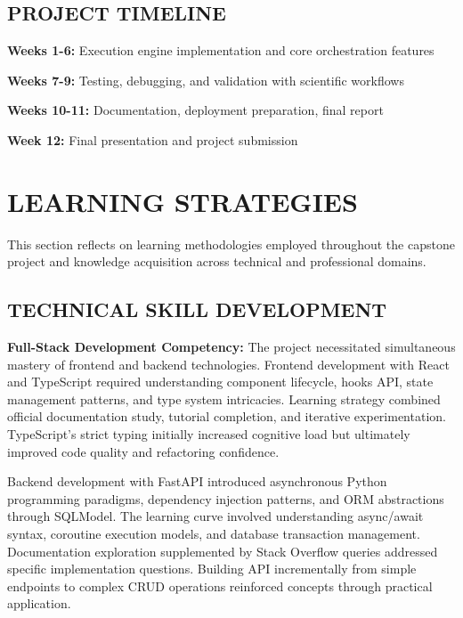 \documentclass[12pt]{article}
\begin{document}
\subsection{PROJECT TIMELINE}

\hspace{\parindent}\textbf{Weeks 1-6:} Execution engine implementation and core orchestration features

\hspace{\parindent}\textbf{Weeks 7-9:} Testing, debugging, and validation with scientific workflows

\hspace{\parindent}\textbf{Weeks 10-11:} Documentation, deployment preparation, final report

\hspace{\parindent}\textbf{Week 12:} Final presentation and project submission

\newpage
\section{LEARNING STRATEGIES}

\hspace{\parindent}This section reflects on learning methodologies employed throughout the capstone project and knowledge acquisition across technical and professional domains.

\subsection{TECHNICAL SKILL DEVELOPMENT}

\hspace{\parindent}\textbf{Full-Stack Development Competency:} The project necessitated simultaneous mastery of frontend and backend technologies. Frontend development with React and TypeScript required understanding component lifecycle, hooks API, state management patterns, and type system intricacies. Learning strategy combined official documentation study, tutorial completion, and iterative experimentation. TypeScript's strict typing initially increased cognitive load but ultimately improved code quality and refactoring confidence.

Backend development with FastAPI introduced asynchronous Python programming paradigms, dependency injection patterns, and ORM abstractions through SQLModel. The learning curve involved understanding async/await syntax, coroutine execution models, and database transaction management. Documentation exploration supplemented by Stack Overflow queries addressed specific implementation questions. Building API incrementally from simple endpoints to complex CRUD operations reinforced concepts through practical application.
\end{document}
